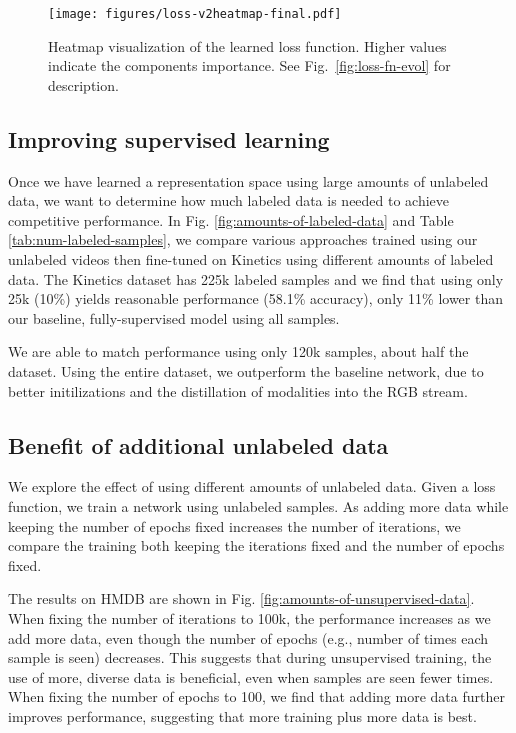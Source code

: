 \documentclass[10pt,twocolumn,letterpaper]{article}
\begin{document}
\begin{figure}
\vspace{-4mm}
    \centering
    \texttt{[image: figures/loss-v2heatmap-final.pdf]}
    \caption{Heatmap visualization of the learned loss function. Higher values indicate the components importance. See Fig.~\ref{fig:loss-fn-evol} for description.}
    \label{fig:loss-heatmap}
    \vspace{-2mm}
\end{figure}


\subsection{Improving supervised learning}
Once we have learned a representation space using large amounts of unlabeled data, we want to determine how much labeled data is needed to achieve competitive performance. In Fig. \ref{fig:amounts-of-labeled-data} and Table \ref{tab:num-labeled-samples}, we compare various approaches trained using our unlabeled videos then fine-tuned on Kinetics using different amounts of labeled data. The Kinetics dataset has 225k labeled samples and we find that using only 25k (10\%) yields reasonable performance (58.1\% accuracy), only 11\% lower than our baseline, fully-supervised model using all samples.

We are able to match performance using only 120k samples, about half the dataset. Using the entire dataset, we outperform the baseline network, due to better initilizations and the distillation of modalities into the RGB stream.




\subsection{Benefit of additional unlabeled data}
We explore the effect of using different amounts of unlabeled data. Given a loss function, we train a network using  unlabeled samples. As adding more data while keeping the number of epochs fixed increases the number of iterations, we compare the training both keeping the iterations fixed and the number of epochs fixed.

The results on HMDB are shown in Fig. \ref{fig:amounts-of-unsupervised-data}. When fixing the number of iterations to 100k, the performance increases as we add more data, even though the number of epochs (e.g., number of times each sample is seen) decreases. This suggests that during unsupervised training, the use of more, diverse data is beneficial, even when samples are seen fewer times. When fixing the number of epochs to 100, we find that adding more data further improves performance, suggesting that more training plus more data is best.
\end{document}
